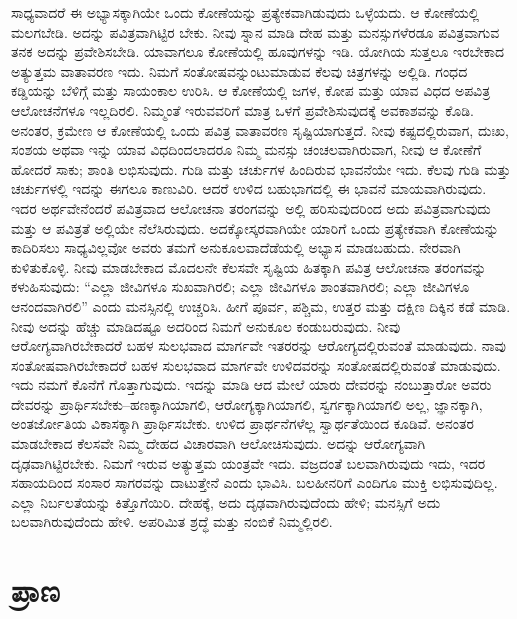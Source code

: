 ಸಾಧ್ಯವಾದರೆ ಈ ಅಭ್ಯಾಸಕ್ಕಾಗಿಯೇ ಒಂದು ಕೋಣೆಯನ್ನು ಪ್ರತ್ಯೇಕವಾಗಿಡುವುದು ಒಳ್ಳೆಯದು. ಆ ಕೋಣೆಯಲ್ಲಿ ಮಲಗಬೇಡಿ. ಅದನ್ನು ಪವಿತ್ರವಾಗಿಟ್ಟಿರ ಬೇಕು. ನೀವು ಸ್ನಾನ ಮಾಡಿ ದೇಹ ಮತ್ತು ಮನಸ್ಸುಗಳೆರಡೂ ಪವಿತ್ರವಾಗುವ ತನಕ ಅದನ್ನು ಪ್ರವೇಶಿಸಬೇಡಿ. ಯಾವಾಗಲೂ ಕೋಣೆಯಲ್ಲಿ ಹೂವುಗಳನ್ನು ಇಡಿ. ಯೋಗಿಯ ಸುತ್ತಲೂ ಇರಬೇಕಾದ ಅತ್ಯುತ್ತಮ ವಾತಾವರಣ ಇದು. ನಿಮಗೆ ಸಂತೋಷವನ್ನುಂಟುಮಾಡುವ ಕೆಲವು ಚಿತ್ರಗಳನ್ನು ಅಲ್ಲಿಡಿ. ಗಂಧದ ಕಡ್ಡಿಯನ್ನು ಬೆಳಿಗ್ಗೆ ಮತ್ತು ಸಾಯಂಕಾಲ ಉರಿಸಿ. ಆ ಕೋಣೆಯಲ್ಲಿ ಜಗಳ, ಕೋಪ ಮತ್ತು ಯಾವ ವಿಧದ ಅಪವಿತ್ರ ಆಲೋಚನೆಗಳೂ ಇಲ್ಲದಿರಲಿ. ನಿಮ್ಮಂತೆ ಇರುವವರಿಗೆ ಮಾತ್ರ ಒಳಗೆ ಪ್ರವೇಶಿಸುವುದಕ್ಕೆ ಅವಕಾಶವನ್ನು ಕೊಡಿ. ಅನಂತರ, ಕ್ರಮೇಣ ಆ ಕೋಣೆಯಲ್ಲಿ ಒಂದು ಪವಿತ್ರ ವಾತಾವರಣ ಸೃಷ್ಟಿಯಾಗುತ್ತದೆ. ನೀವು ಕಷ್ಟದಲ್ಲಿರುವಾಗ, ದುಃಖ, ಸಂಶಯ ಅಥವಾ ಇನ್ನು ಯಾವ ವಿಧದಿಂದಲಾದರೂ ನಿಮ್ಮ ಮನಸ್ಸು ಚಂಚಲವಾಗಿರುವಾಗ, ನೀವು ಆ ಕೋಣೆಗೆ ಹೋದರೆ ಸಾಕು; ಶಾಂತಿ ಲಭಿಸುವುದು. ಗುಡಿ ಮತ್ತು ಚರ್ಚುಗಳ ಹಿಂದಿರುವ ಭಾವನೆಯೇ ಇದು. ಕೆಲವು ಗುಡಿ ಮತ್ತು ಚರ್ಚುಗಳಲ್ಲಿ ಇದನ್ನು ಈಗಲೂ ಕಾಣುವಿರಿ. ಆದರೆ ಉಳಿದ ಬಹುಭಾಗದಲ್ಲಿ ಈ ಭಾವನೆ ಮಾಯವಾಗಿರುವುದು. ಇದರ ಅರ್ಥವೇನೆಂದರೆ ಪವಿತ್ರವಾದ ಆಲೋಚನಾ ತರಂಗವನ್ನು ಅಲ್ಲಿ ಹರಿಸುವುದರಿಂದ ಅದು ಪವಿತ್ರವಾಗುವುದು ಮತ್ತು ಆ ಪವಿತ್ರತೆ ಅಲ್ಲಿಯೇ ನೆಲೆಸಿರುವುದು. ಅದಕ್ಕೋಸ್ಕರವಾಗಿಯೇ ಯಾರಿಗೆ ಒಂದು ಪ್ರತ್ಯೇಕವಾಗಿ ಕೋಣೆಯನ್ನು ಕಾದಿರಿಸಲು ಸಾಧ್ಯವಿಲ್ಲವೋ ಅವರು ತಮಗೆ ಅನುಕೂಲವಾದೆಡೆಯಲ್ಲಿ ಅಭ್ಯಾಸ ಮಾಡಬಹುದು. ನೇರವಾಗಿ ಕುಳಿತುಕೊಳ್ಳಿ. ನೀವು ಮಾಡಬೇಕಾದ ಮೊದಲನೇ ಕೆಲಸವೇ ಸೃಷ್ಟಿಯ ಹಿತಕ್ಕಾಗಿ ಪವಿತ್ರ ಆಲೋಚನಾ ತರಂಗವನ್ನು ಕಳುಹಿಸುವುದು: “ಎಲ್ಲಾ ಜೀವಿಗಳೂ ಸುಖವಾಗಿರಲಿ; ಎಲ್ಲಾ ಜೀವಿಗಳೂ ಶಾಂತವಾಗಿರಲಿ; ಎಲ್ಲಾ ಜೀವಿಗಳೂ ಆನಂದವಾಗಿರಲಿ” ಎಂದು ಮನಸ್ಸಿನಲ್ಲಿ ಉಚ್ಚರಿಸಿ. ಹೀಗೆ ಪೂರ್ವ, ಪಶ್ಚಿಮ, ಉತ್ತರ ಮತ್ತು ದಕ್ಷಿಣ ದಿಕ್ಕಿನ ಕಡೆ ಮಾಡಿ. ನೀವು ಅದನ್ನು ಹೆಚ್ಚು ಮಾಡಿದಷ್ಟೂ ಅದರಿಂದ ನಿಮಗೆ ಅನುಕೂಲ ಕಂಡುಬರುವುದು. ನೀವು ಆರೋಗ್ಯವಾಗಿರಬೇಕಾದರೆ ಬಹಳ ಸುಲಭವಾದ ಮಾರ್ಗವೇ ಇತರರನ್ನು ಆರೋಗ್ಯದಲ್ಲಿರುವಂತೆ ಮಾಡುವುದು. ನಾವು ಸಂತೋಷವಾಗಿರಬೇಕಾದರೆ ಬಹಳ ಸುಲಭವಾದ ಮಾರ್ಗವೇ ಉಳಿದವರನ್ನು ಸಂತೋಷದಲ್ಲಿರುವಂತೆ ಮಾಡುವುದು. ಇದು ನಮಗೆ ಕೊನೆಗೆ ಗೊತ್ತಾಗುವುದು. ಇದನ್ನು ಮಾಡಿ ಆದ ಮೇಲೆ ಯಾರು ದೇವರನ್ನು ನಂಬುತ್ತಾರೋ ಅವರು ದೇವರನ್ನು ಪ್ರಾರ್ಥಿಸಬೇಕು–ಹಣಕ್ಕಾಗಿಯಾಗಲಿ, ಆರೋಗ್ಯಕ್ಕಾಗಿಯಾಗಲಿ, ಸ್ವರ್ಗಕ್ಕಾಗಿಯಾಗಲಿ ಅಲ್ಲ, ಜ್ಞಾನಕ್ಕಾಗಿ, ಅಂತರ್ಜೋತಿಯ ವಿಕಾಸಕ್ಕಾಗಿ ಪ್ರಾರ್ಥಿಸಬೇಕು. ಉಳಿದ ಪ್ರಾರ್ಥನೆಗಳೆಲ್ಲ ಸ್ವಾರ್ಥತೆಯಿಂದ ಕೂಡಿವೆ. ಅನಂತರ ಮಾಡಬೇಕಾದ ಕೆಲಸವೇ ನಿಮ್ಮ ದೇಹದ ವಿಚಾರವಾಗಿ ಆಲೋಚಿಸುವುದು. ಅದನ್ನು ಆರೋಗ್ಯವಾಗಿ ದೃಢವಾಗಿಟ್ಟಿರಬೇಕು. ನಿಮಗೆ ಇರುವ ಅತ್ಯುತ್ತಮ ಯಂತ್ರವೇ ಇದು. ವಜ್ರದಂತೆ ಬಲವಾಗಿರುವುದು ಇದು, ಇದರ ಸಹಾಯದಿಂದ ಸಂಸಾರ ಸಾಗರವನ್ನು ದಾಟುತ್ತೇನೆ ಎಂದು ಭಾವಿಸಿ. ಬಲಹೀನರಿಗೆ ಎಂದಿಗೂ ಮುಕ್ತಿ ಲಭಿಸುವುದಿಲ್ಲ. ಎಲ್ಲಾ ನಿರ್ಬಲತೆಯನ್ನು ಕಿತ್ತೊಗೆಯಿರಿ. ದೇಹಕ್ಕೆ, ಅದು ದೃಢವಾಗಿರುವುದೆಂದು ಹೇಳಿ; ಮನಸ್ಸಿಗೆ ಅದು ಬಲವಾಗಿರುವುದೆಂದು ಹೇಳಿ. ಅಪರಿಮಿತ ಶ್ರದ್ಧೆ ಮತ್ತು ನಂಬಿಕೆ ನಿಮ್ಮಲ್ಲಿರಲಿ.

\chapter{ಪ್ರಾಣ}

